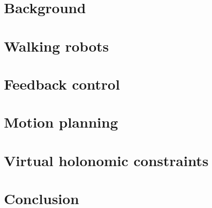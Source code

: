\section{Background}


\section{Walking robots}


\section{Feedback control} \label{sec:feedback}
 

\section{Motion planning}


\section{Virtual holonomic constraints}\label{sec:virtconstraint}


\section{Conclusion}
